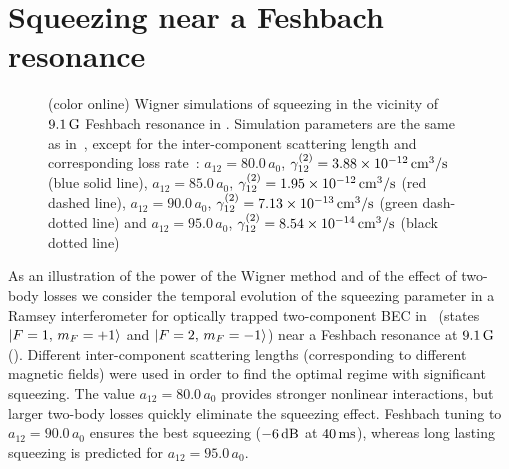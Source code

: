 \section{Squeezing near a Feshbach resonance}


\begin{figure}

    \caption[]{(color online)
    Wigner simulations of squeezing in the vicinity of $9.1\mbox{\ensuremath{\,\mathrm{G}}}$ Feshbach resonance in \Rb.
    Simulation parameters are the same as in~,
    except for the inter-component scattering length and corresponding loss rate~\cite{Kaufman2009}:
    $a_{12} = 80.0\,a_0$, $\gamma^{(2)}_{12} = 3.88 \times 10^{-12}\mbox{\ensuremath{\,\mathrm{cm^3/s}}}$ (blue solid line),
    $a_{12} = 85.0\,a_0$, $\gamma^{(2)}_{12} = 1.95 \times 10^{-12}\mbox{\ensuremath{\,\mathrm{cm^3/s}}}$ (red dashed line),
    $a_{12} = 90.0\,a_0$, $\gamma^{(2)}_{12} = 7.13 \times 10^{-13}\mbox{\ensuremath{\,\mathrm{cm^3/s}}}$ (green dash-dotted line) and
    $a_{12} = 95.0\,a_0$, $\gamma^{(2)}_{12} = 8.54 \times 10^{-14}\mbox{\ensuremath{\,\mathrm{cm^3/s}}}$ (black dotted line)}

    \label{fig:squeezing}
\end{figure}

As an illustration of the power of the Wigner method and of the effect of two-body losses we consider the temporal evolution of the squeezing parameter in a Ramsey interferometer for optically trapped two-component BEC in \Rb\ (states ${\mbox{\ensuremath{\vert F=1,\, m_F=+1 \rangle}}}$ and ${\mbox{\ensuremath{\vert F=2,\, m_F=-1 \rangle}}}$) near a Feshbach resonance at $9.1\mbox{\ensuremath{\,\mathrm{G}}}$ ().
Different inter-component scattering lengths (corresponding to different magnetic fields)
were used in order to find the optimal regime with significant squeezing.
The value $a_{12} = 80.0\,a_0$ provides stronger nonlinear interactions, but larger two-body losses quickly eliminate the squeezing effect.
Feshbach tuning to $a_{12} = 90.0\,a_0$ ensures the best squeezing ($-6\mbox{\ensuremath{\,\mathrm{dB}}}$ at $40\mbox{\ensuremath{\,\mathrm{ms}}}$), whereas long lasting squeezing is predicted for $a_{12} = 95.0\,a_0$.

